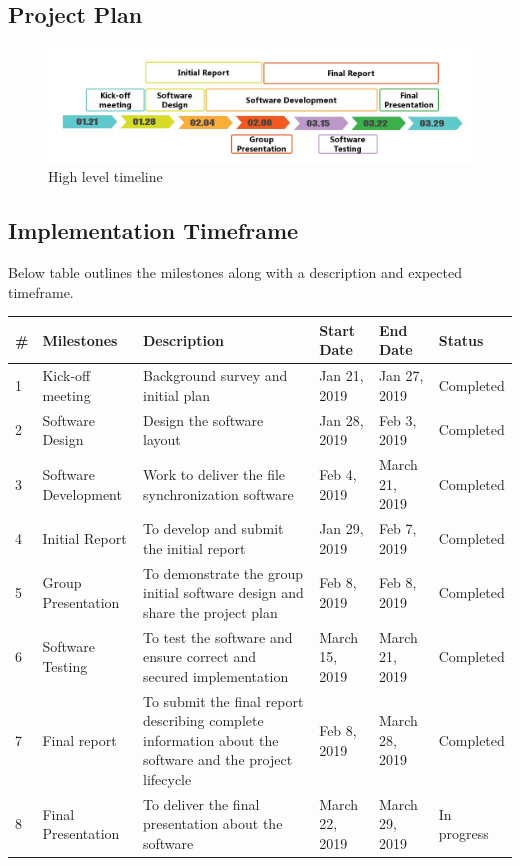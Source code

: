 \documentclass{article}
\begin{document}
\subsection{Project Plan}

\begin{figure}[H]
    \centering
    \includegraphics[width=1\textwidth]{timeline}
    \caption{High level timeline}
    \label{fig:timeline1}
\end{figure}

\subsection{Implementation Timeframe}
Below table outlines the milestones along with a description and expected timeframe.

\begin{center}
\begin{tabular}{ | m{3em} | m{2cm}| m{3cm} | m{1cm} | m{1cm} | m{2cm} |}
\hline
\textbf{\#} & \textbf{Milestones} & \textbf{Description} & \textbf{Start Date} & \textbf{End Date} & \textbf{Status}  \\
\hline
1 & Kick-off meeting & Background survey and initial plan & Jan 21, 2019 & Jan 27, 2019 & Completed \\
\hline
2 & Software Design  & Design the software layout & Jan 28, 2019 & Feb 3, 2019 & Completed \\
\hline
3 & Software Development & Work to deliver the file synchronization software & Feb 4, 2019 & March 21, 2019 & Completed \\
\hline
4 & Initial Report & To develop and submit the initial report & Jan 29, 2019 & Feb 7, 2019 & Completed \\
\hline
5 & Group Presentation & To demonstrate  the group initial software design and share the project plan & Feb 8, 2019 & Feb 8, 2019 & Completed \\
\hline
6 & Software Testing &  To test the software and ensure correct and secured implementation & March 15, 2019 & March 21, 2019 & Completed \\
\hline
7 & Final report & To submit the final report describing complete information about the software and the project lifecycle & Feb 8, 2019 & March 28, 2019 & Completed \\
\hline
8 & Final Presentation & To deliver the final presentation about the software & March 22, 2019 & March 29, 2019 & In progress \\
\hline
\end{tabular}
\end{center}
\end{document}
